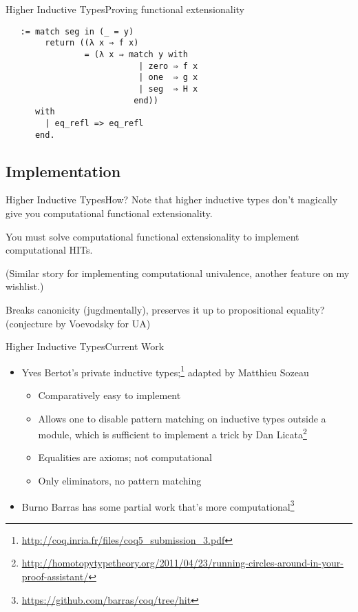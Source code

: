 \documentclass{beamer}
\begin{document}
\begin{frame}[fragile]{Higher Inductive Types}{Proving functional extensionality}
  \Large
\begin{verbatim}
   := match seg in (_ = y)
        return ((λ x ⇒ f x)
                = (λ x ⇒ match y with
                           | zero ⇒ f x
                           | one  ⇒ g x
                           | seg  ⇒ H x
                          end))
      with
        | eq_refl => eq_refl
      end.
\end{verbatim}
\end{frame}

\subsection{Implementation}

\begin{frame}{Higher Inductive Types}{How?}
  \Large
  Note that higher inductive types don't magically give you computational functional extensionality. \pause
  
  You must solve computational functional extensionality to implement computational HITs. \pause
  
  (Similar story for implementing computational univalence, another feature on my wishlist.) \pause
  
  Breaks canonicity \pause (jugdmentally), \pause preserves it up to propositional equality? {\normalsize (conjecture by Voevodsky for UA)}
\end{frame}

\begin{frame}{Higher Inductive Types}{Current Work}
  \Large
  \begin{itemize}
    \item Yves Bertot's private inductive types;\footnote{\url{http://coq.inria.fr/files/coq5\_submission_3.pdf}} adapted by Matthieu Sozeau \pause
      \begin{itemize} \large
        \item Comparatively easy to implement \pause
        \item Allows one to disable pattern matching on inductive types outside a module, which is sufficient to implement a trick by Dan Licata\footnote<3->{\url{http://homotopytypetheory.org/2011/04/23/running-circles-around-in-your-proof-assistant/}} \pause
        \item Equalities are axioms; not computational \pause
        \item Only eliminators, no pattern matching \pause
      \end{itemize}
    \item Burno Barras has some partial work that's more computational\footnote<6->{\url{https://github.com/barras/coq/tree/hit}}
  \end{itemize}
\end{frame}
\end{document}
